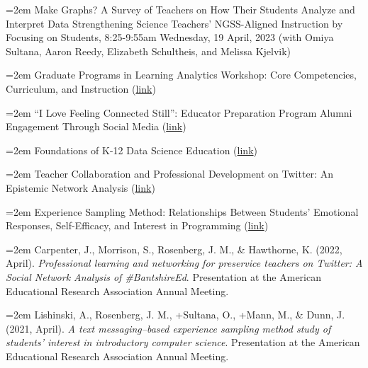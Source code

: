 \documentclass[
  14,
]{article}
\begin{document}
\hangindent=2em Make Graphs? A Survey of Teachers on How Their Students
Analyze and Interpret Data Strengthening Science Teachers' NGSS-Aligned
Instruction by Focusing on Students, 8:25-9:55am Wednesday, 19 April,
2023 (with Omiya Sultana, Aaron Reedy, Elizabeth Schultheis, and Melissa
Kjelvik)

\hangindent=2em Graduate Programs in Learning Analytics Workshop: Core
Competencies, Curriculum, and Instruction
(\href{https://convention2.allacademic.com/one/aera/aera23/index.php?cmd=Online+Program+View+Session\&selected_session_id=2011190\&PHPSESSID=ioumtke7pucbovqhj69hl0moa8}{link})

\hangindent=2em ``I Love Feeling Connected Still'': Educator Preparation
Program Alumni Engagement Through Social Media
(\href{https://convention2.allacademic.com/one/aera/aera23/index.php?cmd=Online+Program+View+Paper\&selected_paper_id=2011288\&PHPSESSID=ioumtke7pucbovqhj69hl0moa8}{link})

\hangindent=2em Foundations of K-12 Data Science Education
(\href{https://convention2.allacademic.com/one/aera/aera23/index.php?cmd=Online+Program+View+Session\&selected_session_id=2009288\&PHPSESSID=ioumtke7pucbovqhj69hl0moa8}{link})

\hangindent=2em Teacher Collaboration and Professional Development on
Twitter: An Epistemic Network Analysis
(\href{https://convention2.allacademic.com/one/aera/aera23/index.php?cmd=Online+Program+View+Paper\&selected_paper_id=2002459\&PHPSESSID=ioumtke7pucbovqhj69hl0moa8}{link})

\hangindent=2em Experience Sampling Method: Relationships Between
Students' Emotional Responses, Self-Efficacy, and Interest in
Programming
(\href{https://convention2.allacademic.com/one/aera/aera23/index.php?cmd=Online+Program+View+Event\&selected_box_id=375059\&PHPSESSID=ioumtke7pucbovqhj69hl0moa8}{link})

\hangindent=2em Carpenter, J., Morrison, S., Rosenberg, J. M., \&
Hawthorne, K. (2022, April). \emph{Professional learning and networking
for preservice teachers on Twitter: A Social Network Analysis of
\#BantshireEd}. Presentation at the American Educational Research
Association Annual Meeting.

\hangindent=2em Lishinski, A., Rosenberg, J. M., +Sultana, O., +Mann,
M., \& Dunn, J. (2021, April). \emph{A text messaging--based experience
sampling method study of students' interest in introductory computer
science}. Presentation at the American Educational Research Association
Annual Meeting.
\end{document}

